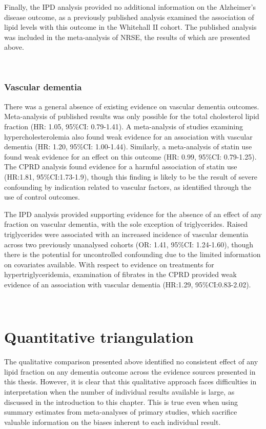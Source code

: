\documentclass[a4paper, twoside]{templates/ociamthesis}
\begin{document}
Finally, the IPD analysis provided no additional information on the Alzheimer's disease outcome, as a previously published analysis examined the association of lipid levels with this outcome in the Whitehall II cohort. The published analysis was included in the meta-analysis of NRSE, the results of which are presented above.

~

\hypertarget{vascular-dementia}{%
\subsubsection{Vascular dementia}\label{vascular-dementia}}

There was a general absence of existing evidence on vascular dementia outcomes. Meta-analysis of published results was only possible for the total cholesterol lipid fraction (HR: 1.05, 95\%CI: 0.79-1.41). A meta-analysis of studies examining hypercholesterolemia also found weak evidence for an association with vascular dementia (HR: 1.20, 95\%CI: 1.00-1.44). Similarly, a meta-analysis of statin use found weak evidence for an effect on this outcome (HR: 0.99, 95\%CI: 0.79-1.25). The CPRD analysis found evidence for a harmful association of statin use (HR:1.81, 95\%CI:1.73-1.9), though this finding is likely to be the result of severe confounding by indication related to vascular factors, as identified through the use of control outcomes.

The IPD analysis provided supporting evidence for the absence of an effect of any fraction on vascular dementia, with the sole exception of triglycerides. Raised triglycerides were associated with an increased incidence of vascular dementia across two previously unanalysed cohorts (OR: 1.41, 95\%CI: 1.24-1.60), though there is the potential for uncontrolled confounding due to the limited information on covariates available. With respect to evidence on treatments for hypertriglyceridemia, examination of fibrates in the CPRD provided weak evidence of an association with vascular dementia (HR:1.29, 95\%CI:0.83-2.02).

~

\hypertarget{quantitative-triangulation}{%
\section{Quantitative triangulation}\label{quantitative-triangulation}}

The qualitative comparison presented above identified no consistent effect of any lipid fraction on any dementia outcome across the evidence sources presented in this thesis. However, it is clear that this qualitative approach faces difficulties in interpretation when the number of individual results available is large, as discussed in the introduction to this chapter. This is true even when using summary estimates from meta-analyses of primary studies, which sacrifice valuable information on the biases inherent to each individual result.
\end{document}
